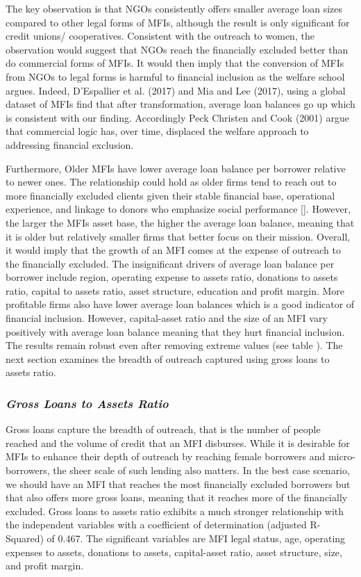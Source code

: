 \documentclass[
]{article}
\begin{document}
The key observation is that NGOs consistently offers smaller average
loan sizes compared to other legal forms of MFIs, although the result is
only significant for credit unions/ cooperatives. Consistent with the
outreach to women, the observation would suggest that NGOs reach the
financially excluded better than do commercial forms of MFIs. It would
then imply that the conversion of MFIs from NGOs to legal forms is
harmful to financial inclusion as the welfare school argues. Indeed,
D'Espallier et al. (2017) and Mia and Lee (2017), using a global dataset
of MFIs find that after transformation, average loan balances go up
which is consistent with our finding. Accordingly Peck Christen and Cook
(2001) argue that commercial logic has, over time, displaced the welfare
approach to addressing financial exclusion.

Furthermore, Older MFIs have lower average loan balance per borrower
relative to newer ones. The relationship could hold as older firms tend
to reach out to more financially excluded clients given their stable
financial base, operational experience, and linkage to donors who
emphasize social performance {[}{]}. However, the larger the MFIs asset
base, the higher the average loan balance, meaning that it is older but
relatively smaller firms that better focus on their mission. Overall, it
would imply that the growth of an MFI comes at the expense of outreach
to the financially excluded. The insignificant drivers of average loan
balance per borrower include region, operating expense to assets ratio,
donations to assets ratio, capital to assets ratio, asset structure,
education and profit margin. More profitable firms also have lower
average loan balances which is a good indicator of financial inclusion.
However, capital-asset ratio and the size of an MFI vary positively with
average loan balance meaning that they hurt financial inclusion. The
results remain robust even after removing extreme values (see table ).
The next section examines the breadth of outreach captured using gross
loans to assets ratio.

\hypertarget{gross-loans-to-assets-ratio}{%
\subsubsection{\texorpdfstring{\textbf{\emph{Gross Loans to Assets
Ratio}}}{Gross Loans to Assets Ratio}}\label{gross-loans-to-assets-ratio}}

Gross loans capture the breadth of outreach, that is the number of
people reached and the volume of credit that an MFI disburses. While it
is desirable for MFIs to enhance their depth of outreach by reaching
female borrowers and micro-borrowers, the sheer scale of such lending
also matters. In the best case scenario, we should have an MFI that
reaches the most financially excluded borrowers but that also offers
more gross loans, meaning that it reaches more of the financially
excluded. Gross loans to assets ratio exhibits a much stronger
relationship with the independent variables with a coefficient of
determination (adjusted R-Squared) of 0.467. The significant variables
are MFI legal status, age, operating expenses to assets, donations to
assets, capital-asset ratio, asset structure, size, and profit margin.
\end{document}

